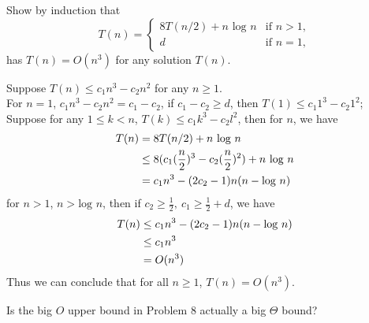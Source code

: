 \documentclass[11pt, a4paper, UTF8]{ctexart}
\begin{document}
\begin{problem}[CS: 4.5.8]
  Show by induction that
  \[ T(n) = 
  \begin{cases}
    8T(n/2) + n\text{ log }n & \text{if } n > 1, \\
    d & \text{if } n = 1,
  \end{cases} \]
  has $T(n) = O(n^{3})$ for any solution $T(n)$.
\end{problem}

\begin{solution}
  Suppose $T(n) \leq c_{1}n^{3} - c_{2}n^{2}$ for any $n \geq 1$.\\
  For $n = 1$, $c_{1}n^{3} - c_{2}n^{2} = c_{1} - c_{2}$, if $c_{1} - c_{2} \geq d$, 
  then $T(1) \leq c_{1}1^{3} - c_{2}1^{2}$;\\
  Suppose for any $1 \leq k < n$, $T(k) \leq c_{1}k^{3} - c_{2}l^{2}$, then 
  for $n$, we have
  \begin{align}
    T(n) & = 8T(n/2) + n \text{ log } n \notag \\
         & \leq 8(c_{1}(\frac{n}{2})^{3} - c_{2}(\frac{n}{2})^{2}) + n \text{ log } n \notag \\
         & = c_{1}n^{3} - (2c_{2} - 1)n(n - \text{log }n) \notag
  \end{align}
  for $n > 1$, $n > \text{log }n$, then if $c_{2} \geq \frac{1}{2},~c_{1}\geq \frac{1}{2} + d$, 
  we have
  \begin{align}
    T(n) & \leq c_{1}n^{3} - (2c_{2} - 1)n(n - \text{log }n) \notag \\
         & \leq c_{1}n^{3} \notag \\
         & = O(n^{3}) \notag
  \end{align}
  Thus we can conclude that for all $n \geq 1$, $T(n) = O(n^{3})$.
\end{solution}

\begin{problem}[CS: 4.5.9]
  Is the big $O$ upper bound in Problem 8 actually a big $\Theta$ bound?
\end{problem}
\end{document}
